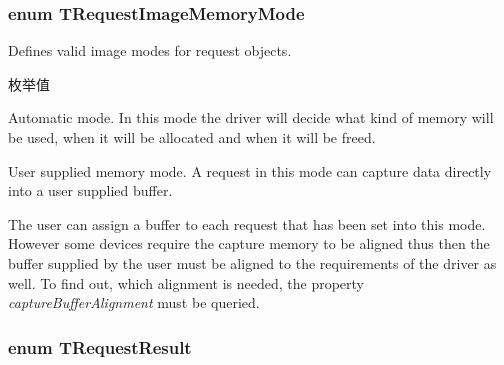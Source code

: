 \hypertarget{group___common_interface_ga3c4728ceba74a7bbd5ca93d32fa2e2f3}{
\subsubsection[{T\+Request\+Image\+Memory\+Mode}]{\setlength{\rightskip}{0pt plus 5cm}enum {\bf T\+Request\+Image\+Memory\+Mode}}}\label{group___common_interface_ga3c4728ceba74a7bbd5ca93d32fa2e2f3}


Defines valid image modes for request objects. 

\begin{Desc}
\item[枚举值]\par
\begin{description}
\item[{\em 
\hypertarget{group___common_interface_gga3c4728ceba74a7bbd5ca93d32fa2e2f3abe4260223490070acfadebc131a5edfe}{rimm\+Auto}\label{group___common_interface_gga3c4728ceba74a7bbd5ca93d32fa2e2f3abe4260223490070acfadebc131a5edfe}
}]Automatic mode. In this mode the driver will decide what kind of memory will be used, when it will be allocated and when it will be freed. \item[{\em 
\hypertarget{group___common_interface_gga3c4728ceba74a7bbd5ca93d32fa2e2f3a1f4d712fb072e326d3492c44c2c51cea}{rimm\+User}\label{group___common_interface_gga3c4728ceba74a7bbd5ca93d32fa2e2f3a1f4d712fb072e326d3492c44c2c51cea}
}]User supplied memory mode. A request in this mode can capture data directly into a user supplied buffer.

The user can assign a buffer to each request that has been set into this mode. However some devices require the capture memory to be aligned thus then the buffer supplied by the user must be aligned to the requirements of the driver as well. To find out, which alignment is needed, the property {\itshape capture\+Buffer\+Alignment} must be queried. \end{description}
\end{Desc}
\hypertarget{group___common_interface_gab6148762ea638f8eabbabfc9468b0d4c}{
\subsubsection[{T\+Request\+Result}]{\setlength{\rightskip}{0pt plus 5cm}enum {\bf T\+Request\+Result}}}\label{group___common_interface_gab6148762ea638f8eabbabfc9468b0d4c}


